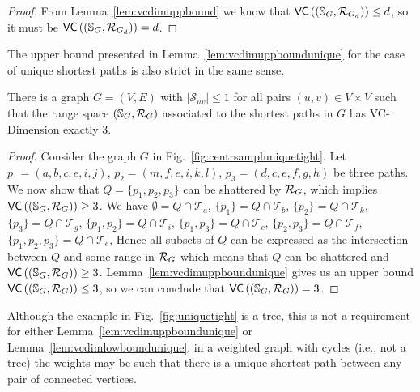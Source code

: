 \begin{proof}
  From Lemma~\ref{lem:vcdimuppbound} we know that
  $\mathsf{VC}\left((\mathbb{S}_G,\mathcal{R}_{G_d})\right)\le d$, so
  it must be $\mathsf{VC}\left((\mathbb{S}_G,\mathcal{R}_{G_d})\right)=d$.
\end{proof}

The upper bound presented in Lemma~\ref{lem:vcdimuppboundunique}  for the case
of unique shortest paths is also strict in the same sense.

\begin{lemma}\label{lem:vcdimlowboundunique}
  There is a graph $G=(V,E)$ with $|\mathcal{S}_{uv}|\le1$ for all
  pairs $(u,v)\in V\times V$ such that the range space $(\mathbb{S}_G,\mathcal{R}_G)$ associated to the
  shortest paths in $G$ has VC-Dimension exactly $3$.
\end{lemma}


\begin{proof}
  Consider the graph $G$ in Fig.~\ref{fig:centrsampluniquetight}.
  Let $p_1=(a,b,c,e,i,j)$, $p_2=(m,f,e,i,k,l)$, $p_3=(d,c,e,f,g,h)$ be three
  paths. We now show that $Q=\{p_1,p_2,p_3\}$ can be shattered by $\mathcal{R}_G$, which
  implies $\mathsf{VC}\left((\mathbb{S}_G,\mathcal{R}_G)\right)\ge 3$. We have $\emptyset=Q\cap\mathcal{T}_a$,
  $\{p_1\}=Q\cap\mathcal{T}_b$, $\{p_2\}=Q\cap\mathcal{T}_k$,
  $\{p_3\}=Q\cap\mathcal{T}_g$, $\{p_1,p_2\}=Q\cap\mathcal{T}_i$,
  $\{p_1,p_3\}=Q\cap\mathcal{T}_c$, $\{p_2,p_3\}=Q\cap\mathcal{T}_f$,
  $\{p_1,p_2,p_3\}=Q\cap\mathcal{T}_e$,  
  Hence all subsets of $Q$ can be expressed as the intersection between $Q$ and
  some range in $\mathcal{R}_G$ which means that $Q$ can be shattered and
  $\mathsf{VC}\left((\mathbb{S}_G,\mathcal{R}_G)\right)\ge 3$. Lemma~\ref{lem:vcdimuppboundunique} gives us an upper
  bound $\mathsf{VC}\left((\mathbb{S}_G,\mathcal{R}_G)\right)\le3$, so we can conclude that
  $\mathsf{VC}\left((\mathbb{S}_G,\mathcal{R}_G)\right)=3$.
\end{proof}

Although the example in Fig.~\ref{fig:uniquetight} is a tree, this is not a
requirement for either Lemma~\ref{lem:vcdimuppboundunique} or
Lemma~\ref{lem:vcdimlowboundunique}: in a weighted graph with cycles (i.e., not
a tree) the weights may be such that there is a unique shortest path between any
pair of connected vertices.


